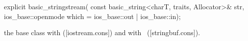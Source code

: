 \documentclass[ebook,11pt,article]{memoir}
\renewcommand{\iref}[1]{[#1]}
\begin{document}
%
\begin{itemdecl}
explicit basic_stringstream(
  const basic_string<charT, traits, Allocator>& str,
  ios_base::openmode which = ios_base::out | ios_base::in);
\end{itemdecl}

\begin{itemdescr}
\pnum
\effects
{} the base class with
(\iref{iostream.cons})
and  with%
~(\iref{stringbuf.cons}).
\end{itemdescr}
\end{document}
